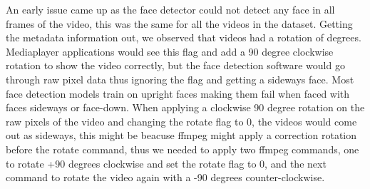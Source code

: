 \documentclass[12pt]{article}
\begin{document}
An early issue came up as the face detector could not detect any face in all frames of the video, this was the same for all the videos in the dataset. Getting the metadata information out, we observed that videos had a rotation of  degrees. Mediaplayer applications would see this flag and add a 90 degree clockwise rotation to show the video correctly, but the face detection software would go through raw pixel data thus ignoring the flag and getting a sideways face. Most face detection models train on upright faces making them fail when faced with faces sideways or face-down. When applying a clockwise 90 degree rotation on the raw pixels of the video and changing the rotate flag to 0, the videos would come out as sideways, this might be beacuse ffmpeg might apply a correction rotation before the rotate command, thus we needed to apply two ffmpeg commands, one to rotate +90 degrees clockwise and set the rotate flag to 0, and the next command to rotate the video again with a -90 degrees counter-clockwise.
\end{document}
